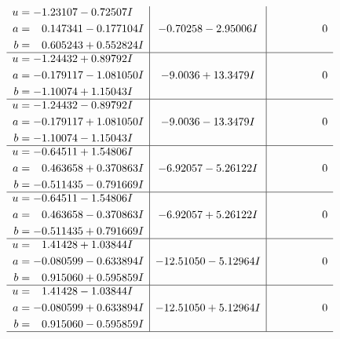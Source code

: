 \documentclass[1p]{elsarticle_modified}
\theoremstyle{definition}
\begin{document}
$$\begin{array}{c|c|c}
\begin{aligned}
u &= -1.23107 - 0.72507 I \\
a &= \phantom{-}0.147341 - 0.177104 I \\
b &= \phantom{-}0.605243 + 0.552824 I\end{aligned}
 & -0.70258 - 2.95006 I & \phantom{-0.000000 } 0 \\ \hline\begin{aligned}
u &= -1.24432 + 0.89792 I \\
a &= -0.179117 - 1.081050 I \\
b &= -1.10074 + 1.15043 I\end{aligned}
 & -9.0036 + 13.3479 I & \phantom{-0.000000 } 0 \\ \hline\begin{aligned}
u &= -1.24432 - 0.89792 I \\
a &= -0.179117 + 1.081050 I \\
b &= -1.10074 - 1.15043 I\end{aligned}
 & -9.0036 - 13.3479 I & \phantom{-0.000000 } 0 \\ \hline\begin{aligned}
u &= -0.64511 + 1.54806 I \\
a &= \phantom{-}0.463658 + 0.370863 I \\
b &= -0.511435 - 0.791669 I\end{aligned}
 & -6.92057 - 5.26122 I & \phantom{-0.000000 } 0 \\ \hline\begin{aligned}
u &= -0.64511 - 1.54806 I \\
a &= \phantom{-}0.463658 - 0.370863 I \\
b &= -0.511435 + 0.791669 I\end{aligned}
 & -6.92057 + 5.26122 I & \phantom{-0.000000 } 0 \\ \hline\begin{aligned}
u &= \phantom{-}1.41428 + 1.03844 I \\
a &= -0.080599 - 0.633894 I \\
b &= \phantom{-}0.915060 + 0.595859 I\end{aligned}
 & -12.51050 - 5.12964 I & \phantom{-0.000000 } 0 \\ \hline\begin{aligned}
u &= \phantom{-}1.41428 - 1.03844 I \\
a &= -0.080599 + 0.633894 I \\
b &= \phantom{-}0.915060 - 0.595859 I\end{aligned}
 & -12.51050 + 5.12964 I & \phantom{-0.000000 } 0\\
 \hline 
 \end{array}$$\newpage\newpage\renewcommand{\arraystretch}{1}
\end{document}
